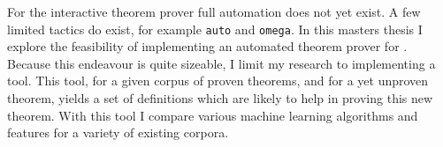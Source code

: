 
For the \coq interactive theorem prover full automation does not yet exist.
A few limited tactics do exist, for example \texttt{auto} and \texttt{omega}.
In this masters thesis I explore the feasibility of implementing an automated theorem prover for \coq.
Because this endeavour is quite sizeable, I limit my research to implementing a \premiseselection tool.
This tool, for a given corpus of proven theorems, and for a yet unproven theorem, yields a set of definitions which are likely to help in proving this new theorem.
With this tool I compare various machine learning algorithms and features for a variety of existing \coq corpora.
